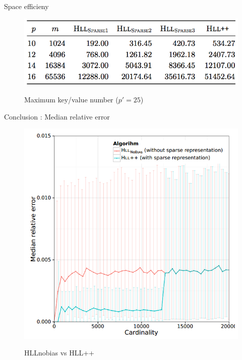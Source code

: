 \documentclass{beamer}
\begin{document}

\begin{frame}{Space efficieny}
  
\begin{figure}[c]
\includegraphics [scale=0.45]  {sparse_all.png}

Maximum key/value number ($p' = 25$)
\end{figure}
\end{frame}



\begin{frame}{Conclusion : Median relative error}
\begin{figure}[c]
\includegraphics [scale=0.30]  {hll_fig5.png}

HLLnobias vs HLL++
\end{figure}
\end{frame}
\end{document}
